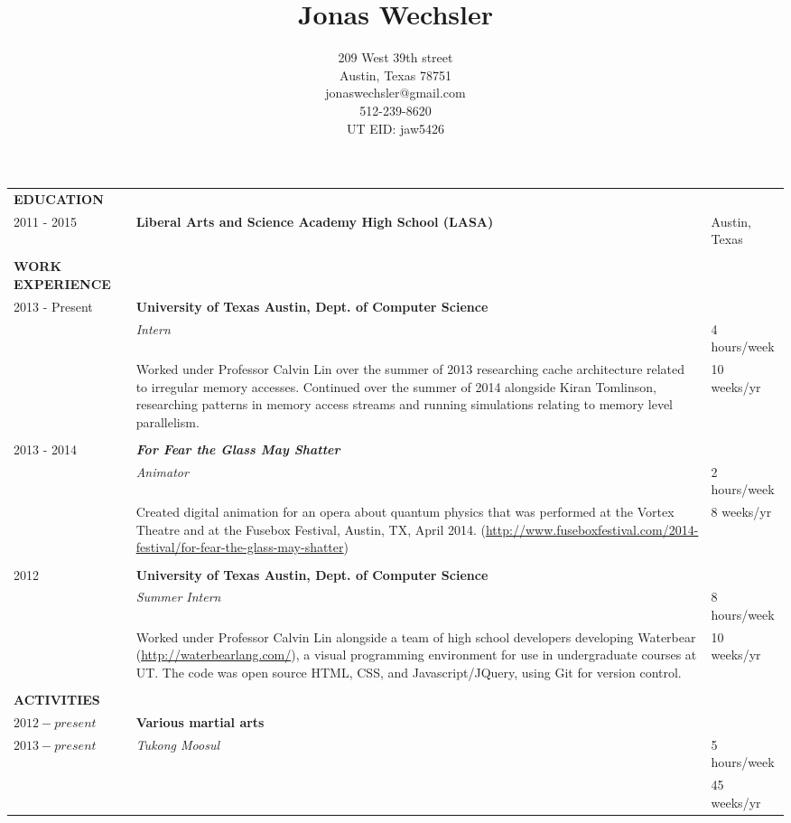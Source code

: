 \documentclass{article}
\title{Jonas Wechsler}
\author{209 West 39th street\\Austin, Texas 78751\\jonaswechsler@gmail.com\\512-239-8620\\UT EID: jaw5426}
\date{}
\begin{document}
	\maketitle
	\begin{tabularx}{\textwidth - 20pt}{@{}l X l}
		\textbf{EDUCATION} & &\\
		2011 - 2015 & \textbf{Liberal Arts and Science Academy High School (LASA)} & Austin, Texas\\
		\\
		\textbf{WORK EXPERIENCE} & &\\
		2013 - Present & \textbf{University of Texas Austin, Dept. of Computer Science} & \\
		& \emph{Intern} & 4 hours/week \\
		& Worked under Professor Calvin Lin over the summer of 2013 researching cache architecture related to irregular memory accesses. Continued over the summer of 2014 alongside Kiran Tomlinson, researching patterns in memory access streams and running simulations relating to memory level parallelism. & 10 weeks/yr\\
		\\
		2013 - 2014 & \textbf{\emph{For Fear the Glass May Shatter}} & \\
		& \emph{Animator} & 2 hours/week \\
		& Created digital animation for an opera about quantum physics that was performed at the Vortex Theatre and at the Fusebox Festival, Austin, TX, April 2014. (\url{http://www.fuseboxfestival.com/2014-festival/for-fear-the-glass-may-shatter}) & 8 weeks/yr\\
		\\
		2012 & \textbf{University of Texas Austin, Dept. of Computer Science} & \\
		& \emph{Summer Intern} & 8 hours/week \\
		& Worked under Professor Calvin Lin alongside a team of high school developers developing Waterbear (\url{http://waterbearlang.com/}), a visual programming environment for use in undergraduate courses at UT. The code was open source HTML, CSS, and Javascript/JQuery, using Git for version control. & 10 weeks/yr\\
		\\
		\textbf{ACTIVITIES} & & \\
		$2012 - present$ & \textbf{Various martial arts}\\
		$2013 - present$ & \emph{Tukong Moosul} & 5 hours/week\\
		& & 45 weeks/yr\\

\end{tabularx}
\end{document}
